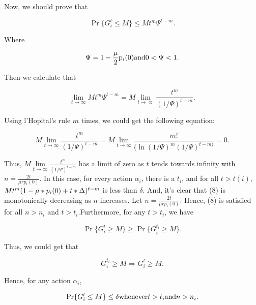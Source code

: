 Now, we should prove that

\begin{equation}
\Pr \{ G_i^t \le M\}  \le M{t^m}{\Psi ^{t - m}}.
\end{equation}

Where

\begin{equation}
\Psi  = 1 - \frac{\mu }{2}{{\rm{p}}_i}{\rm{(0)  and  }}0 < \Psi  < 1.
\end{equation}

Then we calculate that

\begin{equation}
\mathop {\lim }\limits_{t \to \infty } M{t^m}{\Psi ^{t - m}} = M{\lim _{t \to  \propto }}\frac{{{t^m}}}{{{{(1/\Psi )}^{t - m}}}}.
\end{equation}

Using l’Hopital's rule $m$ times, we could get the following equation:

\begin{equation}
M\mathop {\lim }\limits_{t \to \infty } \frac{{{t^m}}}{{{{(1/\Psi )}^{t - m}}}} = M\mathop {\lim }\limits_{t \to \infty } \frac{{m!}}{{(\ln {{(1/\Psi )}^m}{{(1/\Psi )}^{t - m)}}}} = 0.
\end{equation}

Thus, $M\mathop {\lim }\limits_{t \to \infty } \frac{{{t^m}}}{{{{(1/\Psi )}^{t - m}}}}$ has a limit of zero as $t$ tends towards infinity with $n = \frac{{2t}}{{\mu rp{}_i(0)}}$. In this case, for every action ${\alpha _i}$, there is a ${t_i}$, and for all $t > t(i)$, $M{t^m}{{\rm{(1}} - \mu*{p_i}(0) + t*\Delta )^{t - m}}$ is less than $\delta$. And, it’s clear that (8) is monotonically decreasing as $n$ increases. Let $n = \frac{{2t}}{{\mu rp{}_i(0)}}$. Hence, (8) is satisfied for all $n > {n_i}$ and $t > {t_i}$.Furthermore, for any $t > {t_i}$, we have

\begin{equation}
\Pr \{ G_i^t \ge M\}  \ge \Pr \{ G_i^{{t_i}} \ge M\} .
\end{equation}

Thus, we could get that

\begin{equation}
G_i^{{t_i}} \ge M \Rightarrow G_i^t \ge M.
\end{equation}

Hence, for any action ${\alpha _i}$,

\begin{equation}
\Pr \{ G_i^t \le M\}  \le \delta {\rm{ whenever }}t > {t_i}{\rm{ and }}n > {n_i}.
\end{equation}

